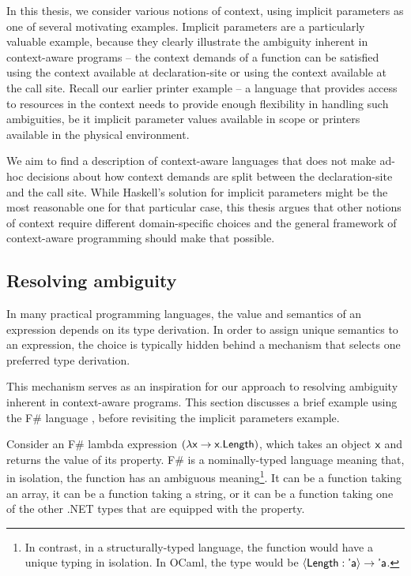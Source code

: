 In this thesis, we consider various notions of context, using implicit parameters as one
of several motivating examples. Implicit parameters are a particularly valuable example, because they
clearly illustrate the ambiguity inherent in context-aware programs -- the context demands of
a function can be satisfied using the context available at declaration-site or using the context
available at the call site. Recall our earlier printer example -- a language that
provides access to resources in the context needs to provide enough flexibility in handling such
ambiguities, be it implicit parameter values available in scope or printers available in the
physical environment.

We aim to find a description of context-aware languages that does not make ad-hoc decisions
about how context demands are split between the declaration-site and the call site. While
Haskell's solution for implicit parameters might be the most reasonable one for that particular
case, this thesis argues that other notions of context require different domain-specific choices
and the general framework of context-aware programming should make that possible.


\subsection{Resolving ambiguity}
\label{sec:path-binding-amb}

In many practical programming languages, the value and semantics of an expression depends on its
type derivation. In order to assign unique semantics to an expression, the choice is typically
hidden behind a mechanism that selects one preferred type derivation.

This mechanism serves as an inspiration for our approach to resolving ambiguity inherent in
context-aware programs. This section discusses a brief example using the F\# language \cite{app-fsharp},
before revisiting the implicit parameters example.

Consider an F\# lambda expression $(\lambda\textnormal{\sffamily x}\rightarrow\textnormal{\sffamily x.Length})$, which takes
an object $\textnormal{\sffamily x}$ and returns the value of its  property. F\# is a nominally-typed
language meaning that, in isolation, the function has an ambiguous meaning\footnote{In contrast,
in a structurally-typed language, the function would have a unique typing in isolation. In OCaml,
the type would be $\langle \textnormal{\sffamily Length}:\textnormal{\sffamily 'a}\rangle \rightarrow \textnormal{\sffamily 'a}$.}. It can be
a function taking an array, it can be a function taking a string, or it can be a function taking
one of the other .NET types that are equipped with the  property.


